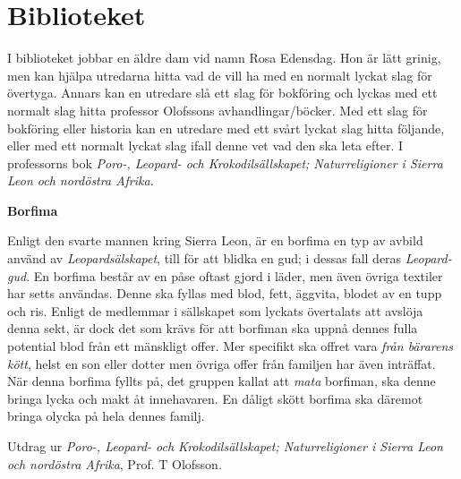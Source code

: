\section{Biblioteket}
I biblioteket jobbar en äldre dam vid namn Rosa Edensdag. Hon är lätt grinig, men kan hjälpa utredarna hitta vad de vill ha med en normalt lyckat slag för övertyga. Annars kan en utredare slå ett slag för bokföring och lyckas med ett normalt slag hitta professor Olofssons avhandlingar/böcker. Med ett slag för bokföring eller historia kan en utredare med ett svårt lyckat slag hitta följande, eller med ett normalt lyckat slag ifall denne vet vad den ska leta efter. I professorns bok \textit{Poro-, Leopard- och Krokodilsällskapet; Naturreligioner i Sierra Leon och nordöstra Afrika}.

\begin{displayquote}
	\textbf{Borfima}

	Enligt den svarte mannen kring Sierra Leon, är en borfima en typ av avbild använd av \textit{Leopardsälskapet}, till för att blidka en gud; i dessas fall deras \textit{Leopard-gud}. En borfima består av en påse oftast gjord i läder, men även övriga textiler har setts användas. Denne ska fyllas med blod, fett, äggvita, blodet av en tupp och ris. Enligt de medlemmar i sällskapet som lyckats övertalats att avslöja denna sekt, är dock det som krävs för att borfiman ska uppnå dennes fulla potential blod från ett mänskligt offer. Mer specifikt ska offret vara \textit{från bärarens kött}, helst en son eller dotter men övriga offer från familjen har även inträffat. När denna borfima fyllts på, det gruppen kallat att \textit{mata} borfiman, ska denne bringa lycka och makt åt innehavaren. En dåligt skött borfima ska däremot bringa olycka på hela dennes familj.

	Utdrag ur \textit{Poro-, Leopard- och Krokodilsällskapet; Naturreligioner i Sierra Leon och nordöstra Afrika}, Prof. T Olofsson.
\end{displayquote}
